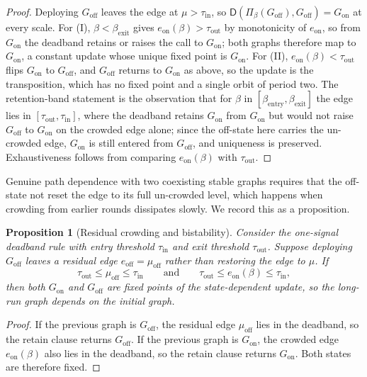 \documentclass[11pt]{article}
\theoremstyle{plain}
\newtheorem{proposition}{Proposition}
\theoremstyle{definition}
\newcommand{\Dop}{\mathsf{D}}
\newcommand{\Pidep}{\Pi_\beta}
\begin{document}
\begin{proof}
Deploying $G_{\mathrm{off}}$ leaves the edge at $\mu>\tau_{\mathrm{in}}$, so $\Dop(\Pidep(G_{\mathrm{off}}),G_{\mathrm{off}})=G_{\mathrm{on}}$ at every scale. For (I), $\beta<\beta_{\mathrm{exit}}$ gives $e_{\mathrm{on}}(\beta)>\tau_{\mathrm{out}}$ by monotonicity of $e_{\mathrm{on}}$, so from $G_{\mathrm{on}}$ the deadband retains or raises the call to $G_{\mathrm{on}}$; both graphs therefore map to $G_{\mathrm{on}}$, a constant update whose unique fixed point is $G_{\mathrm{on}}$. For (II), $e_{\mathrm{on}}(\beta)<\tau_{\mathrm{out}}$ flips $G_{\mathrm{on}}$ to $G_{\mathrm{off}}$, and $G_{\mathrm{off}}$ returns to $G_{\mathrm{on}}$ as above, so the update is the transposition, which has no fixed point and a single orbit of period two. The retention-band statement is the observation that for $\beta$ in $[\beta_{\mathrm{entry}},\beta_{\mathrm{exit}}]$ the edge lies in $[\tau_{\mathrm{out}},\tau_{\mathrm{in}}]$, where the deadband retains $G_{\mathrm{on}}$ from $G_{\mathrm{on}}$ but would not raise $G_{\mathrm{off}}$ to $G_{\mathrm{on}}$ on the crowded edge alone; since the off-state here carries the un-crowded edge, $G_{\mathrm{on}}$ is still entered from $G_{\mathrm{off}}$, and uniqueness is preserved. Exhaustiveness follows from comparing $e_{\mathrm{on}}(\beta)$ with $\tau_{\mathrm{out}}$.
\end{proof}

Genuine path dependence with two coexisting stable graphs requires that the off-state not reset the edge to its full un-crowded level, which happens when crowding from earlier rounds dissipates slowly. We record this as a proposition.

\begin{proposition}[Residual crowding and bistability]\label{prop:bistable}
Consider the one-signal deadband rule with entry threshold $\tau_{\mathrm{in}}$ and exit threshold $\tau_{\mathrm{out}}$. Suppose deploying $G_{\mathrm{off}}$ leaves a residual edge $e_{\mathrm{off}}=\mu_{\mathrm{off}}$ rather than restoring the edge to $\mu$. If
\[
\tau_{\mathrm{out}}\le\mu_{\mathrm{off}}\le\tau_{\mathrm{in}}
\qquad\text{and}\qquad
\tau_{\mathrm{out}}\le e_{\mathrm{on}}(\beta)\le\tau_{\mathrm{in}},
\]
then both $G_{\mathrm{on}}$ and $G_{\mathrm{off}}$ are fixed points of the state-dependent update, so the long-run graph depends on the initial graph.
\end{proposition}

\begin{proof}
If the previous graph is $G_{\mathrm{off}}$, the residual edge $\mu_{\mathrm{off}}$ lies in the deadband, so the retain clause returns $G_{\mathrm{off}}$. If the previous graph is $G_{\mathrm{on}}$, the crowded edge $e_{\mathrm{on}}(\beta)$ also lies in the deadband, so the retain clause returns $G_{\mathrm{on}}$. Both states are therefore fixed.
\end{proof}
\end{document}
